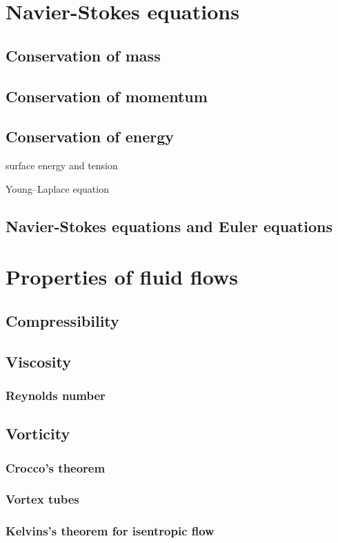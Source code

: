 \chapter{Navier-Stokes equations}
\section{Conservation of mass}
\section{Conservation of momentum}
\section{Conservation of energy}
surface energy and tension

Young–Laplace equation
\section{Navier-Stokes equations and Euler equations}

\chapter{Properties of fluid flows}
\section{Compressibility}
\section{Viscosity}
\subsection{Reynolds number}
\section{Vorticity}
\subsection{Crocco's theorem}
\subsection{Vortex tubes}
\subsection{Kelvins's theorem for isentropic flow}

